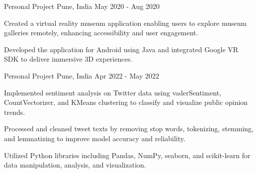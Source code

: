 \begin{cventries}
    \cventry
    {Personal Project} %
    {} %
    {Pune, India} %
    {May 2020 - Aug 2020} %
    {
        \begin{cvitems} %
            \item {Created a virtual reality museum application enabling users to explore museum galleries remotely, enhancing accessibility and user engagement.}
            \item {Developed the application for Android using Java and integrated Google VR SDK to deliver immersive 3D experiences.}
        \end{cvitems}
    }

    \cventry
    {Personal Project} %
    {} %
    {Pune, India} %
    {Apr 2022 - May 2022} %
    {
        \begin{cvitems} %
            \item {Implemented sentiment analysis on Twitter data using vaderSentiment, CountVectorizer, and KMeans clustering to classify and visualize public opinion trends.}
            \item {Processed and cleaned tweet texts by removing stop words, tokenizing, stemming, and lemmatizing to improve model accuracy and reliability.}
            \item {Utilized Python libraries including Pandas, NumPy, seaborn, and scikit-learn for data manipulation, analysis, and visualization.}
        \end{cvitems}
    }


\end{cventries}
